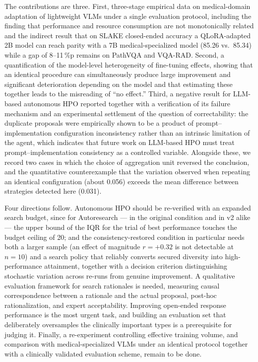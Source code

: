 The contributions are three. First, three-stage empirical data on medical-domain
adaptation of lightweight VLMs under a single evaluation protocol, including the
finding that performance and resource consumption are not monotonically related
and the indirect result that on SLAKE closed-ended accuracy a QLoRA-adapted 2B
model can reach parity with a 7B medical-specialized model (85.26 vs.\ 85.34)
while a gap of 8--11\,\%p remains on PathVQA and VQA-RAD. Second, a
quantification of the model-level heterogeneity of fine-tuning effects, showing
that an identical procedure can simultaneously produce large improvement and
significant deterioration depending on the model and that estimating these
together leads to the misreading of ``no effect.'' Third, a negative result for
LLM-based autonomous HPO reported together with a verification of its failure
mechanism and an experimental settlement of the question of correctability: the
duplicate proposals were empirically shown to be a product of prompt--
implementation configuration inconsistency rather than an intrinsic limitation of
the agent, which indicates that future work on LLM-based HPO must treat
prompt--implementation consistency as a controlled variable. Alongside these, we
record two cases in which the choice of aggregation unit reversed the conclusion,
and the quantitative counterexample that the variation observed when repeating an
identical configuration (about 0.056) exceeds the mean difference between
strategies detected here (0.031).

Four directions follow. Autonomous HPO should be re-verified with an expanded
search budget, since for Autoresearch --- in the original condition and in v2
alike --- the upper bound of the IQR for the trial of best performance touches the
budget ceiling of 20; and the consistency-restored condition in particular needs
both a larger sample (an effect of magnitude $r = +0.32$ is not detectable at
$n = 10$) and a search policy that reliably converts secured diversity into
high-performance attainment, together with a decision criterion distinguishing
stochastic variation across re-runs from genuine improvement. A qualitative
evaluation framework for search rationales is needed, measuring causal
correspondence between a rationale and the actual proposal, post-hoc
rationalization, and expert acceptability. Improving open-ended response
performance is the most urgent task, and building an evaluation set that
deliberately oversamples the clinically important types is a prerequisite for
judging it. Finally, a re-experiment controlling effective training volume, and
comparison with medical-specialized VLMs under an identical protocol together
with a clinically validated evaluation scheme, remain to be done.
